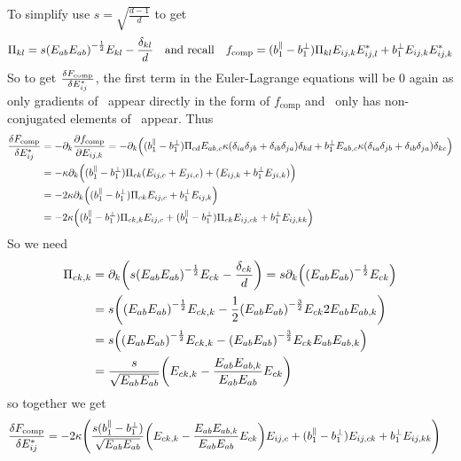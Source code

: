 \documentclass[11pt]{article}
\begin{document}
To simplify use $s=\sqrt{\frac{d-1}{d}}$ to get
\begin{equation}
    \Pi_{kl} = s \qty(E_{ab}E_{ab})^{-\frac{1}{2}}E_{kl} - \frac{\delta_{kl}}{d} \qq{and recall} f_\text{comp} = (b_1^\parallel - b_1^\perp) \Pi_{kl} E_{ij,k}E_{ij,l}^* + b_1^\perp E_{ij,k}E_{ij,k}^*
\end{equation}
So to get $\fdv{F_\text{comp}}{E_{ij}^*}$, the first term in the Euler-Lagrange equations will be 0 again as only gradients of \EE\ appear directly in the form of $f_\text{comp}$ and \PP\ only has non-conjugated elements of \EE\ appear.
Thus
\begin{align}
    \fdv{F_\text{comp}}{E_{ij}^*} &= -\pp_k \pdv{f_\text{comp}}{E_{ij,k}} = -\pp_k \qty((b_1^\parallel - b_1^\perp) \Pi_{cd} E_{ab,c} \kappa(\ddelta{i}{j}{a}{b})\delta_{kd} + b_1^\perp E_{ab,c}\kappa(\ddelta{i}{j}{a}{b})\delta_{kc}) \\
    &= -\kappa\pp_k \qty((b_1^\parallel - b_1^\perp) \Pi_{ck} (E_{ij,c} + E_{ji,c}) + (E_{ij,k} + b_1^\perp E_{ji,k})) \\
    &= -2\kappa\pp_k \qty((b_1^\parallel - b_1^\perp) \Pi_{ck} E_{ij,c} + b_1^\perp E_{ij,k}) \\
    &= -2\kappa\qty((b_1^\parallel - b_1^\perp) \Pi_{ck,k} E_{ij,c} + (b_1^\parallel - b_1^\perp) \Pi_{ck} E_{ij,ck} + b_1^\perp E_{ij,kk})
\end{align}
So we need
\begin{align}
    \Pi_{ck,k} &= \partial_k \qty( s \qty(E_{ab}E_{ab})^{-\frac{1}{2}}E_{ck} - \frac{\delta_{ck}}{d}) = s \partial_k \qty( \qty(E_{ab}E_{ab})^{-\frac{1}{2}}E_{ck}) \\
    &= s \qty(\qty(E_{ab}E_{ab})^{-\frac{1}{2}}E_{ck,k} - \frac{1}{2}\qty(E_{ab}E_{ab})^{-\frac{3}{2}}E_{ck}2E_{ab}E_{ab,k}) \\
    &= s \qty(\qty(E_{ab}E_{ab})^{-\frac{1}{2}}E_{ck,k} - \qty(E_{ab}E_{ab})^{-\frac{3}{2}}E_{ck}E_{ab}E_{ab,k}) \\
    &= \frac{s}{\sqrt{E_{ab}E_{ab}}} \qty(E_{ck,k} - \frac{E_{ab}E_{ab,k}}{E_{ab}E_{ab}}E_{ck})
\end{align}
so together we get
\begin{align}
    \fdv{F_\text{comp}}{E_{ij}^*} &= -2\kappa\qty(\frac{s(b_1^\parallel - b_1^\perp)}{\sqrt{E_{ab}E_{ab}}} \qty(E_{ck,k} - \frac{E_{ab}E_{ab,k}}{E_{ab}E_{ab}}E_{ck}) E_{ij,c} + (b_1^\parallel - b_1^\perp) E_{ij,ck} + b_1^\perp E_{ij,kk})
\end{align}
\end{document}
